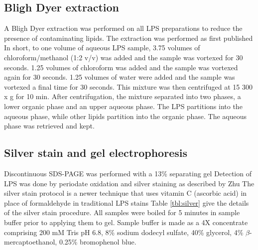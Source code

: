 	\subsection{Bligh Dyer extraction} %
	\label{sub:bligh_dyer_extraction}
  A Bligh Dyer extraction was performed on all \ac{LPS} preparations to reduce the presence of
  contaminating lipids. The extraction was performed as first published In
  short, to one volume of aqueous \ac{LPS} sample, 3.75 volumes of chloroform/methanol (1:2 v/v) was
  added and the sample was vortexed for 30 seconds. 1.25 volumes of chloroform was added and the
  sample was vortexed again for 30 seconds. 1.25 volumes of water were added and the sample was
  vortexed a final time for 30 seconds. This mixture was then centrifuged at 15 300 x g for 10
  min. After centrifugation, the mixture separated into two phases, a lower organic phase and an
  upper aqueous phase. The \ac{LPS} partitions into the aqueous phase, while other lipids partition
  into the organic phase. The aqueous phase was retrieved and kept.

	\subsection{Silver stain and gel electrophoresis} %
	\label{sub:gel_electrophoresis}

  Discontinuous \ac{SDS-PAGE} was performed with a 13\% separating gel Detection
  of \ac{LPS} was done by periodate oxidation and silver staining as described by Zhu
  \etal\! The silver stain protocol is a newer technique that uses
  vitamin C (ascorbic acid) in place of formaldehyde in traditional \ac{LPS}
  stains Table \ref{tbl:silver} give the details of the silver stain
  procedure.%
All samples were boiled for 5 minutes in sample buffer prior to applying them to gel. Sample buffer is made as a 4X concentrate comprising 200 mM Tris pH 6.8, 8\% sodium dodecyl sulfate, 40\% glycerol, 4\% $\beta$-mercaptoethanol, 0.25\% bromophenol blue.


